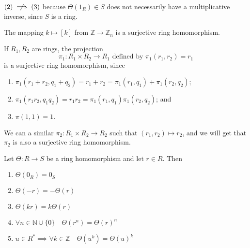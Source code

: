 \begin{note}[Remark]
  $(2) \notimply (3)$ because $\Theta(1_R) \in S$ does not necessarily have a multiplicative inverse, since $S$ is a ring.
\end{note}

\begin{eg}
  The mapping $k \mapsto [k]$ from $\mathbb{Z} \to \mathbb{Z}_n$ is a surjective ring homomorphism.
\end{eg}

\begin{eg}\label{eg:direct_product_of_rings}
  If $R_1, R_2$ are rings, the projection
  \begin{equation*}
    \pi_1 : R_1 \times R_2 \to R_1 \text{ defined by } \pi_1 (r_1, r_2) = r_1
  \end{equation*}
  is a surjective ring homomorphism, since
  \begin{enumerate}
    \item $\pi_1(r_1 + r_2, q_1 + q_2) = r_1 + r_2 = \pi_1(r_1, q_1) + \pi_1(r_2, q_2)$;
    \item $\pi_1(r_1 r_2, q_1 q_2) = r_1 r_2 = \pi_1(r_1, q_1) \pi_1(r_2, q_2)$; and
    \item $\pi(1, 1) = 1$.
  \end{enumerate}
  We can a similar $\pi_2 : R_1 \times R_2 \to R_2$ such that $(r_1, r_2) \mapsto r_2$, and we will get that $\pi_2$ is also a surjective ring homomorphism.
\end{eg}

\begin{propo}
\label{propo:properties_of_ring_homomorphisms}
  Let $\Theta: R \to S$ be a ring homomorphism and let $r \in R$. Then
  \begin{enumerate}
    \item $\Theta(0_R) = 0_S$
    \item $\Theta(-r) = - \Theta(r)$
    \item $\Theta(kr) = k \Theta(r)$
    \item $\forall n \in \mathbb{N} \cup \{0\} \quad \Theta(r^n) = \Theta(r)^n$
    \item $u \in R^* \implies \forall k \in \mathbb{Z} \quad \Theta(u^k) = \Theta(u)^k$
  \end{enumerate}
\end{propo}

